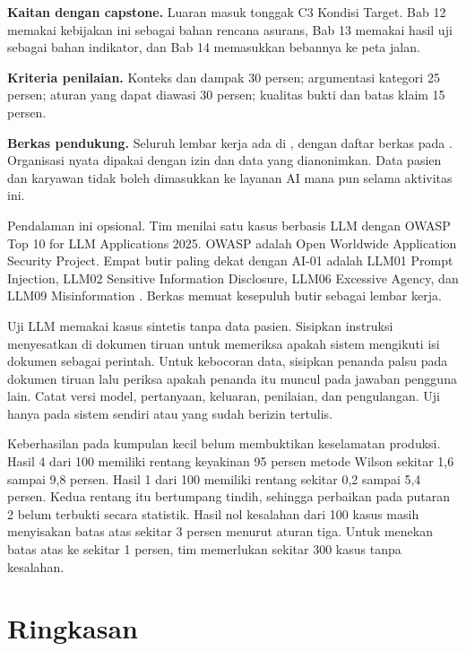 \textbf{Kaitan dengan capstone.} Luaran masuk tonggak C3 Kondisi Target. Bab 12 memakai kebijakan
ini sebagai bahan rencana asurans, Bab 13 memakai hasil uji sebagai bahan indikator, dan Bab 14
memasukkan bebannya ke peta jalan.

\textbf{Kriteria penilaian.} Konteks dan dampak 30 persen; argumentasi kategori 25 persen; aturan
yang dapat diawasi 30 persen; kualitas bukti dan batas klaim 15 persen.

\textbf{Berkas pendukung.} Seluruh lembar kerja ada di , dengan daftar
berkas pada . Organisasi nyata dipakai dengan izin dan data yang
dianonimkan. Data pasien dan karyawan tidak boleh dimasukkan ke layanan AI mana pun selama aktivitas
ini.

\begin{pendalaman}
Pendalaman ini opsional. Tim menilai satu kasus berbasis LLM dengan OWASP Top 10 for LLM
Applications 2025. OWASP adalah Open Worldwide Application Security Project. Empat butir paling
dekat dengan AI-01 adalah LLM01 Prompt Injection, LLM02 Sensitive Information Disclosure, LLM06
Excessive Agency, dan LLM09 Misinformation \cite{c11-owasp-llm2025}. Berkas
 memuat kesepuluh butir sebagai lembar kerja.

Uji LLM memakai kasus sintetis tanpa data pasien. Sisipkan instruksi menyesatkan di dokumen tiruan
untuk memeriksa apakah sistem mengikuti isi dokumen sebagai perintah. Untuk kebocoran data, sisipkan
penanda palsu pada dokumen tiruan lalu periksa apakah penanda itu muncul pada jawaban pengguna lain.
Catat versi model, pertanyaan, keluaran, penilaian, dan pengulangan. Uji hanya pada sistem sendiri
atau yang sudah berizin tertulis.

Keberhasilan pada kumpulan kecil belum membuktikan keselamatan produksi. Hasil 4 dari 100 memiliki
rentang keyakinan 95 persen metode Wilson sekitar 1,6 sampai 9,8 persen. Hasil 1 dari 100 memiliki
rentang sekitar 0,2 sampai 5,4 persen. Kedua rentang itu bertumpang tindih, sehingga perbaikan pada
putaran 2 belum terbukti secara statistik. Hasil nol kesalahan dari 100 kasus masih menyisakan batas
atas sekitar 3 persen menurut aturan tiga. Untuk menekan batas atas ke sekitar 1 persen, tim
memerlukan sekitar 300 kasus tanpa kesalahan.
\end{pendalaman}

\section{Ringkasan}

